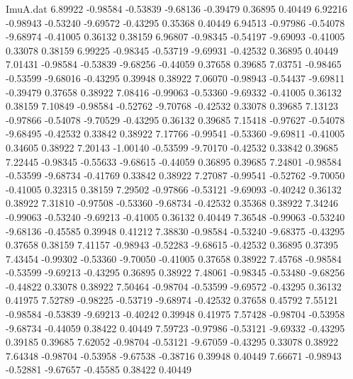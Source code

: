 \begin{filecontents}{ImuA.dat}
   6.89922   -0.98584   -0.53839   -9.68136   -0.39479    0.36895    0.40449
   6.92216   -0.98943   -0.53240   -9.69572   -0.43295    0.35368    0.40449
   6.94513   -0.97986   -0.54078   -9.68974   -0.41005    0.36132    0.38159
   6.96807   -0.98345   -0.54197   -9.69093   -0.41005    0.33078    0.38159
   6.99225   -0.98345   -0.53719   -9.69931   -0.42532    0.36895    0.40449
   7.01431   -0.98584   -0.53839   -9.68256   -0.44059    0.37658    0.39685
   7.03751   -0.98465   -0.53599   -9.68016   -0.43295    0.39948    0.38922
   7.06070   -0.98943   -0.54437   -9.69811   -0.39479    0.37658    0.38922
   7.08416   -0.99063   -0.53360   -9.69332   -0.41005    0.36132    0.38159
   7.10849   -0.98584   -0.52762   -9.70768   -0.42532    0.33078    0.39685
   7.13123   -0.97866   -0.54078   -9.70529   -0.43295    0.36132    0.39685
   7.15418   -0.97627   -0.54078   -9.68495   -0.42532    0.33842    0.38922
   7.17766   -0.99541   -0.53360   -9.69811   -0.41005    0.34605    0.38922
   7.20143   -1.00140   -0.53599   -9.70170   -0.42532    0.33842    0.39685
   7.22445   -0.98345   -0.55633   -9.68615   -0.44059    0.36895    0.39685
   7.24801   -0.98584   -0.53599   -9.68734   -0.41769    0.33842    0.38922
   7.27087   -0.99541   -0.52762   -9.70050   -0.41005    0.32315    0.38159
   7.29502   -0.97866   -0.53121   -9.69093   -0.40242    0.36132    0.38922
   7.31810   -0.97508   -0.53360   -9.68734   -0.42532    0.35368    0.38922
   7.34246   -0.99063   -0.53240   -9.69213   -0.41005    0.36132    0.40449
   7.36548   -0.99063   -0.53240   -9.68136   -0.45585    0.39948    0.41212
   7.38830   -0.98584   -0.53240   -9.68375   -0.43295    0.37658    0.38159
   7.41157   -0.98943   -0.52283   -9.68615   -0.42532    0.36895    0.37395
   7.43454   -0.99302   -0.53360   -9.70050   -0.41005    0.37658    0.38922
   7.45768   -0.98584   -0.53599   -9.69213   -0.43295    0.36895    0.38922
   7.48061   -0.98345   -0.53480   -9.68256   -0.44822    0.33078    0.38922
   7.50464   -0.98704   -0.53599   -9.69572   -0.43295    0.36132    0.41975
   7.52789   -0.98225   -0.53719   -9.68974   -0.42532    0.37658    0.45792
   7.55121   -0.98584   -0.53839   -9.69213   -0.40242    0.39948    0.41975
   7.57428   -0.98704   -0.53958   -9.68734   -0.44059    0.38422    0.40449
   7.59723   -0.97986   -0.53121   -9.69332   -0.43295    0.39185    0.39685
   7.62052   -0.98704   -0.53121   -9.67059   -0.43295    0.33078    0.38922
   7.64348   -0.98704   -0.53958   -9.67538   -0.38716    0.39948    0.40449
   7.66671   -0.98943   -0.52881   -9.67657   -0.45585    0.38422    0.40449

\end{filecontents}
